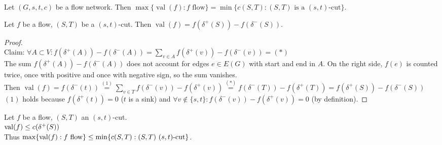 \vspace{0.5cm}
\begin{theorem}\label{4.5}
    Let $(G,s,t,c)$ be a flow network. Then $\max\{\operatorname{val}(f):f\text{ flow}\}=\min\{c(S,T):(S,T) \text{ is a } (s,t)\text{-cut}\}$.
\end{theorem}
\vspace{0.5cm}
\begin{lemma}\label{4.6}
    Let $f$ be a flow, $(S,T)$ be a $(s,t)$-cut. Then $\operatorname{val}(f)=f(\delta^+(S))-f(\delta^-(S))$.
\end{lemma}
\begin{proof}
    \hfill \\
    Claim: $\forall A\subset V:f(\delta^+(A))-f(\delta^-(A))=\sum\limits_{v\in A} f(\delta^+(v))-f(\delta^-(v))=(\ast)$\\
    The sum $f(\delta^+(A))-f(\delta^-(A))$ does not account for edges $e\in E(G)$ with start and end in $A$. On the right side, $f(e)$ is counted twice, once with positive and once with negative sign, so the sum vanishes.\\
    Then $\operatorname{val}(f)=f(\delta^-(t))\stackrel{(1)}{=}\sum\limits_{v\in T}f(\delta^-(v))-f(\delta^+(v))\stackrel{(\ast)}{=}f(\delta^-(T))-f(\delta^+(T))=f(\delta^+(S))-f(\delta^-(S))$\\
    $(1)$ holds because $f(\delta^+(t))=0$ ($t$ is a sink) and $\forall v\notin \{s,t\}:f(\delta^-(v))-f(\delta^+(v))=0$ (by definition).
\end{proof}
\begin{corollary}\label{4.7}
    Let $f$ be a flow, $(S,T)$ an $(s,t)$-cut.\\
    $\operatorname{val}(f)\leq c(\delta^+(S))$\\
    Thus $\max\{\operatorname{val}(f): f \text{ flow}\}\leq \min\{c(S,T):(S,T) \  (s,t)\text{-cut}\}$.
\end{corollary}
